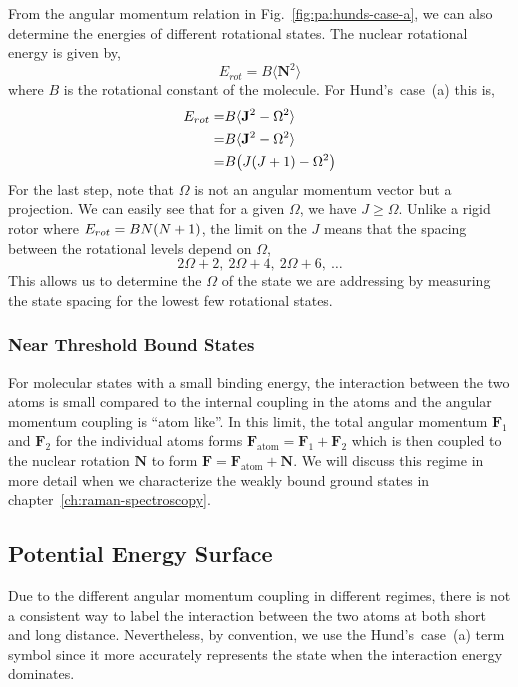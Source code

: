 From the angular momentum relation in Fig.~\ref{fig:pa:hunds-case-a},
we can also determine the energies of different rotational states.
The nuclear rotational energy is given by,
\[
  E_{rot}=B\langle \mathbf{N}^2 \rangle
\]
where $B$ is the rotational constant of the molecule.
For Hund's~case~(a) this is,
\begin{align*}
  E_{rot}=&B\langle \mathbf{J}^2 - \Omega^2 \rangle\\
  =&B\langle \mathbf{J}^2 - \Omega^2 \rangle\\
  =&B{\left({J{\left({J+1}\right)}-\Omega^2}\right)}
\end{align*}
For the last step, note that $\Omega$ is not an angular momentum vector but a projection.
We can easily see that for a given $\Omega$, we have $J\geqslant\Omega$.
Unlike a rigid rotor where $E_{rot}=BN{\left({N+1}\right)}$,
the limit on the $J$ means that the spacing between the rotational levels depend on $\Omega$,
\[2\Omega+2,\ 2\Omega+4,\ 2\Omega+6,\ \dots\]
This allows us to determine the $\Omega$ of the state we are addressing
by measuring the state spacing for the lowest few rotational states.

\subsubsection{Near Threshold Bound States}
\label{ch:pa:structure:near-threshold}

For molecular states with a small binding energy, the interaction between the two atoms is
small compared to the internal coupling in the atoms and
the angular momentum coupling is ``atom like''.
In this limit, the total angular momentum $\mathbf{F}_1$ and $\mathbf{F}_2$
for the individual atoms forms $\mathbf{F}_{\mathrm{atom}}=\mathbf{F}_1+\mathbf{F}_2$
which is then coupled to the nuclear rotation $\mathbf{N}$
to form $\mathbf{F}=\mathbf{F}_{\mathrm{atom}}+\mathbf{N}$.
We will discuss this regime in more detail
when we characterize the weakly bound ground states in chapter~\ref{ch:raman-spectroscopy}.

\subsection{Potential Energy Surface}
\label{ch:pa:pes}

Due to the different angular momentum coupling in different regimes,
there is not a consistent way to label the interaction between the two atoms
at both short and long distance.
Nevertheless, by convention, we use the Hund's~case~(a) term symbol
since it more accurately represents the state when the interaction energy dominates.

